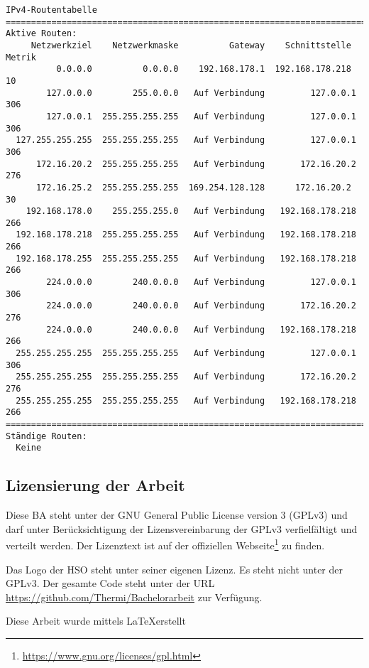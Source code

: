 \begin{lstlisting}[caption=Ausgabe von ipconfig und route -4 print,label=lst:ipconfigroute4]
IPv4-Routentabelle
===========================================================================
Aktive Routen:
     Netzwerkziel    Netzwerkmaske          Gateway    Schnittstelle Metrik
          0.0.0.0          0.0.0.0    192.168.178.1  192.168.178.218     10
        127.0.0.0        255.0.0.0   Auf Verbindung         127.0.0.1    306
        127.0.0.1  255.255.255.255   Auf Verbindung         127.0.0.1    306
  127.255.255.255  255.255.255.255   Auf Verbindung         127.0.0.1    306
      172.16.20.2  255.255.255.255   Auf Verbindung       172.16.20.2    276
      172.16.25.2  255.255.255.255  169.254.128.128      172.16.20.2     30
    192.168.178.0    255.255.255.0   Auf Verbindung   192.168.178.218    266
  192.168.178.218  255.255.255.255   Auf Verbindung   192.168.178.218    266
  192.168.178.255  255.255.255.255   Auf Verbindung   192.168.178.218    266
        224.0.0.0        240.0.0.0   Auf Verbindung         127.0.0.1    306
        224.0.0.0        240.0.0.0   Auf Verbindung       172.16.20.2    276
        224.0.0.0        240.0.0.0   Auf Verbindung   192.168.178.218    266
  255.255.255.255  255.255.255.255   Auf Verbindung         127.0.0.1    306
  255.255.255.255  255.255.255.255   Auf Verbindung       172.16.20.2    276
  255.255.255.255  255.255.255.255   Auf Verbindung   192.168.178.218    266
===========================================================================
Ständige Routen:
  Keine

\end{lstlisting}
\subsection{Lizensierung der Arbeit}
Diese \ac{BA} steht unter der GNU General Public License version 3 (GPLv3)
und darf unter Berücksichtigung der Lizensvereinbarung der GPLv3 verfielfältigt
und verteilt werden. Der Lizenztext ist auf der offiziellen Webseite\footnote{\url{https://www.gnu.org/licenses/gpl.html}}
zu finden.

Das Logo der \ac{HSO} steht unter seiner eigenen Lizenz. Es steht nicht unter der GPLv3.
Der gesamte Code steht unter der URL \url{https://github.com/Thermi/Bachelorarbeit} zur Verfügung.

\begin{centering} 

Diese Arbeit wurde mittels \LaTeX erstellt
\end{centering}
